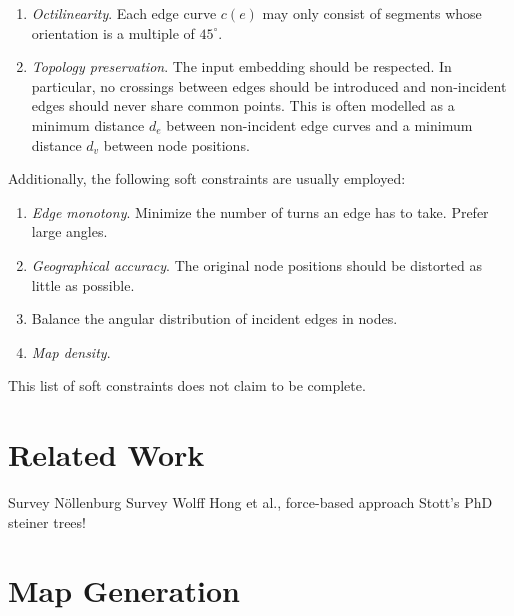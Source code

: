 \documentclass{sig-alternate-sigmod09}
\begin{document}
\begin{enumerate}
\setlength\itemsep{.1em}
\item \emph{Octilinearity}. Each edge curve $c(e)$ may only consist of segments whose orientation is a multiple of $45^{\circ}$.
\item \emph{Topology preservation}. The input embedding should be respected. In particular, no crossings between edges should be introduced and non-incident edges should never share common points. This is often modelled as a minimum distance $d_{e}$ between non-incident edge curves and a minimum distance $d_{v}$ between node positions.
\end{enumerate}

Additionally, the following soft constraints are usually employed:

\begin{enumerate}
\setlength\itemsep{.1em}
\item \emph{Edge monotony}. Minimize the number of turns an edge has to take. Prefer large angles.
\item \emph{Geographical accuracy}. The original node positions should be distorted as little as possible.
\item \emph{} Balance the angular distribution of incident edges in nodes.
\item \emph{Map density}.
\end{enumerate}

This list of soft constraints does not claim to be complete. %

\section{Related Work}

Survey Nöllenburg %
Survey Wolff %
Hong et al., force-based approach
Stott's PhD
steiner trees! %

\section{Map Generation}
\end{document}
